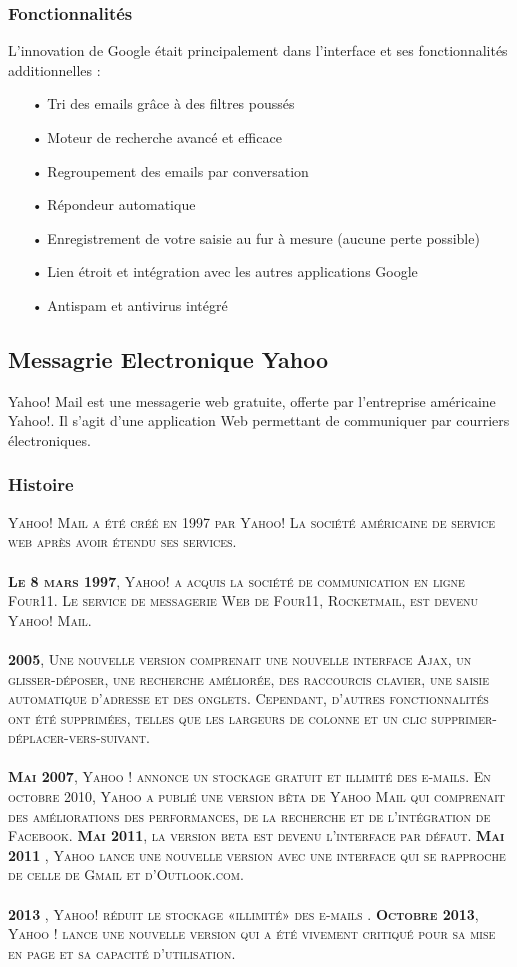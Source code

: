 \documentclass[french]{report}
\begin{document}
\subsubsection{\LARGE Fonctionnalités}
\LARGE L’innovation de Google était principalement dans l’interface et ses fonctionnalités additionnelles :
\begin{itemize}
    \item[•	Tri des emails grâce à des filtres poussés]
    \item[•	Moteur de recherche avancé et efficace]
    \item[•	Regroupement des emails par conversation]
    \item[•	Répondeur automatique]
    \item[• Enregistrement de votre saisie au fur à mesure (aucune perte possible)]
    \item[•	Lien étroit et intégration avec les autres applications Google]
    \item[•	Antispam et antivirus intégré]
\end{itemize}
\subsection{\LARGE Messagrie Electronique Yahoo}
\LARGE Yahoo! Mail est une messagerie web gratuite, offerte par l'entreprise américaine Yahoo!. Il s'agit d'une application Web permettant de communiquer par courriers électroniques.
\subsubsection{\LARGE Histoire}
\LARGE \textsc{ Yahoo! Mail  a été créé en 1997  par Yahoo! La société américaine de service web après avoir étendu ses services.\\ \\
\textbf{Le 8 mars 1997}, Yahoo! a acquis la société de communication en ligne Four11. Le service de messagerie Web de Four11, Rocketmail, est devenu Yahoo! Mail.\\ \\
\textbf{2005}, Une nouvelle version comprenait une nouvelle interface Ajax, un glisser-déposer, une recherche améliorée, des raccourcis clavier, une saisie automatique d'adresse et des onglets. Cependant, d'autres fonctionnalités ont été supprimées, telles que les largeurs de colonne et un clic supprimer-déplacer-vers-suivant.\\ \\
\textbf{Mai 2007}, Yahoo ! annonce un stockage gratuit et illimité des e-mails.
En octobre 2010, Yahoo a publié une version bêta de Yahoo Mail qui comprenait des améliorations des performances, de la recherche et de l'intégration de Facebook.
\textbf{Mai 2011}, la version beta est devenu l'interface par défaut.
\textbf{Mai 2011} , Yahoo lance une nouvelle version avec une interface qui se rapproche de celle de Gmail et d’Outlook.com.\\ \\
\textbf{2013} , Yahoo! réduit le stockage «illimité» des e-mails .
\textbf{Octobre 2013}, Yahoo ! lance une nouvelle version qui a été vivement critiqué pour sa mise en page et sa capacité d'utilisation.}
\end{document}
